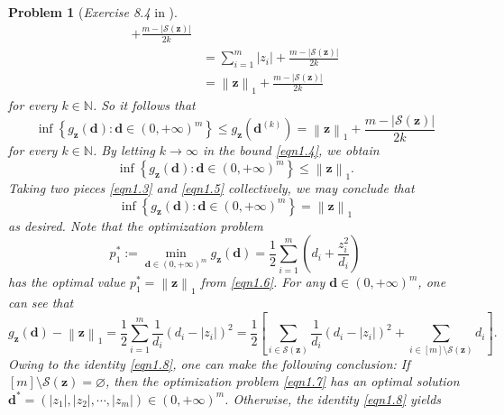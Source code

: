 \documentclass[11pt]{article}
\newtheorem{problem}{Problem}
\numberwithin{equation}{problem}
\begin{document}
\begin{problem} [\emph{Exercise 8.4} in \cite{calafiore2014optimization}]
{\begin{equation*}
\begin{split}
        + \frac{m - \left| \mathcal{S}(\mathbf{z}) \right|}{2k} \\
        &= \sum_{i=1}^{m} \left| z_i \right|
        + \frac{m - \left| \mathcal{S}(\mathbf{z}) \right|}{2k} \\
        &= \left\| \mathbf{z} \right\|_1
        + \frac{m - \left| \mathcal{S}(\mathbf{z}) \right|}{2k}
    \end{split}
\end{equation*}
for every $k \in \mathbb{N}$. So it follows that
\begin{equation}
    \label{eqn1.4}
    \inf \left\{ g_{\mathbf{z}}(\mathbf{d}) : \mathbf{d} \in \left( 0, +\infty \right)^m \right\} \leq g_{\mathbf{z}} \left( \mathbf{d}^{(k)} \right) = \left\| \mathbf{z} \right\|_1
        + \frac{m - \left| \mathcal{S}(\mathbf{z}) \right|}{2k}
\end{equation}
for every $k \in \mathbb{N}$. By letting $k \to \infty$ in the bound \eqref{eqn1.4}, we obtain
\begin{equation}
    \label{eqn1.5}
    \inf \left\{ g_{\mathbf{z}}(\mathbf{d}) : \mathbf{d} \in \left( 0, +\infty \right)^m \right\} \leq \left\| \mathbf{z} \right\|_1.
\end{equation}
Taking two pieces \eqref{eqn1.3} and \eqref{eqn1.5} collectively, we may conclude that
\begin{equation}
    \label{eqn1.6}
    \inf \left\{ g_{\mathbf{z}}(\mathbf{d}) : \mathbf{d} \in \left( 0, +\infty \right)^m \right\} = \left\| \mathbf{z} \right\|_1
\end{equation}
as desired. Note that the optimization problem
\begin{equation}
    \label{eqn1.7}
    p_{1}^* := \min_{\mathbf{d} \in \left( 0, +\infty \right)^m} g_{\mathbf{z}}(\mathbf{d}) = \frac{1}{2}
    \sum_{i=1}^{m} \left( d_i + \frac{z_{i}^2}{d_i} \right)
\end{equation}
has the optimal value $p_{1}^* = \left\| \mathbf{z} \right\|_1$ from \eqref{eqn1.6}. For any $\mathbf{d} \in \left( 0, +\infty \right)^m$, one can see that
\begin{equation}
    \label{eqn1.8}
    g_{\mathbf{z}}(\mathbf{d}) - \left\| \mathbf{z} \right\|_1
    = \frac{1}{2} \sum_{i=1}^{m} \frac{1}{d_i} \left( d_i - \left| z_i \right| \right)^2
    = \frac{1}{2} \left[ \sum_{i \in \mathcal{S}(\mathbf{z})} \frac{1}{d_i} \left( d_i - \left| z_i \right| \right)^2 + \sum_{i \in [m] \setminus \mathcal{S}(\mathbf{z})} d_i \right].
\end{equation}
Owing to the identity \eqref{eqn1.8}, one can make the following conclusion: If $[m] \setminus \mathcal{S}(\mathbf{z}) = \varnothing$, then the optimization problem \eqref{eqn1.7} has an optimal solution $\mathbf{d}^* = \left( \left| z_1 \right|, \left| z_2 \right|, \cdots, \left| z_m \right| \right) \in \left( 0, +\infty \right)^m$. Otherwise, the identity \eqref{eqn1.8} yields
}
\end{problem}
\end{document}
